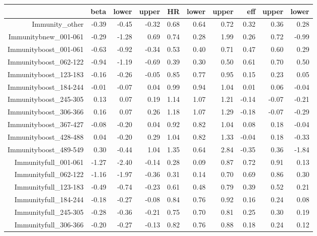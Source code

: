 \begin{table}[ht]
\centering
\begin{tabular}{rrrrrrrrrr}
  \hline
 & beta & lower & upper & HR & lower & upper & eff & upper & lower \\ 
  \hline
Immunity\_other & -0.39 & -0.45 & -0.32 & 0.68 & 0.64 & 0.72 & 0.32 & 0.36 & 0.28 \\ 
  Immunitybnew\_001-061 & -0.29 & -1.28 & 0.69 & 0.74 & 0.28 & 1.99 & 0.26 & 0.72 & -0.99 \\ 
  Immunityboost\_001-061 & -0.63 & -0.92 & -0.34 & 0.53 & 0.40 & 0.71 & 0.47 & 0.60 & 0.29 \\ 
  Immunityboost\_062-122 & -0.94 & -1.19 & -0.69 & 0.39 & 0.30 & 0.50 & 0.61 & 0.70 & 0.50 \\ 
  Immunityboost\_123-183 & -0.16 & -0.26 & -0.05 & 0.85 & 0.77 & 0.95 & 0.15 & 0.23 & 0.05 \\ 
  Immunityboost\_184-244 & -0.01 & -0.07 & 0.04 & 0.99 & 0.94 & 1.04 & 0.01 & 0.06 & -0.04 \\ 
  Immunityboost\_245-305 & 0.13 & 0.07 & 0.19 & 1.14 & 1.07 & 1.21 & -0.14 & -0.07 & -0.21 \\ 
  Immunityboost\_306-366 & 0.16 & 0.07 & 0.26 & 1.18 & 1.07 & 1.29 & -0.18 & -0.07 & -0.29 \\ 
  Immunityboost\_367-427 & -0.08 & -0.20 & 0.04 & 0.92 & 0.82 & 1.04 & 0.08 & 0.18 & -0.04 \\ 
  Immunityboost\_428-488 & 0.04 & -0.20 & 0.29 & 1.04 & 0.82 & 1.33 & -0.04 & 0.18 & -0.33 \\ 
  Immunityboost\_489-549 & 0.30 & -0.44 & 1.04 & 1.35 & 0.64 & 2.84 & -0.35 & 0.36 & -1.84 \\ 
  Immunityfull\_001-061 & -1.27 & -2.40 & -0.14 & 0.28 & 0.09 & 0.87 & 0.72 & 0.91 & 0.13 \\ 
  Immunityfull\_062-122 & -1.16 & -1.97 & -0.36 & 0.31 & 0.14 & 0.70 & 0.69 & 0.86 & 0.30 \\ 
  Immunityfull\_123-183 & -0.49 & -0.74 & -0.23 & 0.61 & 0.48 & 0.79 & 0.39 & 0.52 & 0.21 \\ 
  Immunityfull\_184-244 & -0.18 & -0.27 & -0.08 & 0.84 & 0.76 & 0.92 & 0.16 & 0.24 & 0.08 \\ 
  Immunityfull\_245-305 & -0.28 & -0.36 & -0.21 & 0.75 & 0.70 & 0.81 & 0.25 & 0.30 & 0.19 \\ 
  Immunityfull\_306-366 & -0.20 & -0.27 & -0.13 & 0.82 & 0.76 & 0.88 & 0.18 & 0.24 & 0.12 \\ 

\end{tabular}
\end{table}
